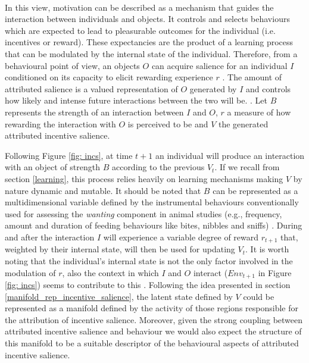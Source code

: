\\
In this view, motivation can be described as a mechanism that guides the interaction between individuals and objects. It controls and selects behaviours which are expected to lead to pleasurable outcomes for the individual (i.e. incentives or reward). These expectancies are the product of a learning process that can be modulated by the internal state of the individual. Therefore, from a behavioural point of view, an objects $O$ can acquire salience for an individual $I$ conditioned on its capacity to elicit rewarding experience $r$ \cite{berridge1998role,mcclure2003computational}. The amount of attributed salience is a valued representation of $O$ generated by $I$ and controls how likely and intense future interactions between the two will be. \cite{berridge1998role,mcclure2003computational}. Let $B$ represents the strength of an interaction between $I$ and $O$, $r$ a measure of how rewarding the interaction with $O$ is perceived to be and $V$ the generated attributed incentive salience.

Following Figure \ref{fig: incs}, at time $t+1$ an individual will produce an interaction with an object of strength $B$ according to the previous $V_{t}$. If we recall from section \ref{learning}, this process relies heavily on learning mechanisms making $V$ by nature dynamic and mutable. It should be noted that $B$ can be represented as a multidimensional variable defined by the instrumental behaviours conventionally used for assessing the \emph{wanting} component in animal studies (e.g., frequency, amount and duration of feeding behaviours like bites, nibbles and sniffs) \cite{berridge1998role}. During and after the interaction $I$ will experience a variable degree of reward $r_{t+1}$ that, weighted by their internal state, will then be used for updating $V_{t}$.  It is worth noting that the individual's internal state is not the only factor involved in the modulation of $r$, also the context in which $I$ and $O$ interact ($Env_{t+1}$ in Figure \ref{fig: incs}) seems to contribute to this \cite{palminteri2015contextual}. Following the idea presented in section \ref{manifold_rep_incentive_salience}, the latent state defined by $V$ could be represented as a manifold defined by the activity of those regions responsible for the attribution of incentive salience. Moreover, given the strong coupling between attributed incentive salience and behaviour \cite{berridge1998role} we would also expect the structure of this manifold to be a suitable descriptor of the behavioural aspects of attributed incentive salience.

